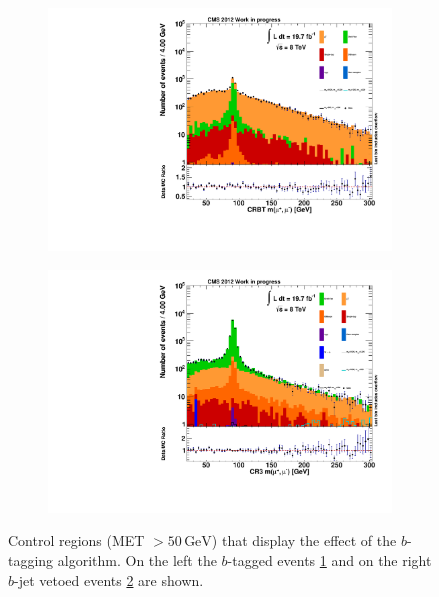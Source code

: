 \begin{figure}[htb!]
  \centering
  \begin{subfigure}[b]{0.495\textwidth}
    \centering
    \includegraphics[width=\textwidth]{plots/crbt.pdf}
    \caption{\label{fig:crbt}}
  \end{subfigure}
  \begin{subfigure}[b]{0.495\textwidth}
    \centering
    \includegraphics[width=\textwidth]{plots/crbv.pdf}
    \caption{\label{fig:crbv}}
  \end{subfigure}
  \caption{Control regions (MET $> 50\,\text{GeV}$) that display the effect of the $b$-tagging algorithm. On the left the $b$-tagged events \ref{fig:crbt} and on the right $b$-jet vetoed events \ref{fig:crbv} are shown.}
  \label{fig:crbtagging}
\end{figure}

